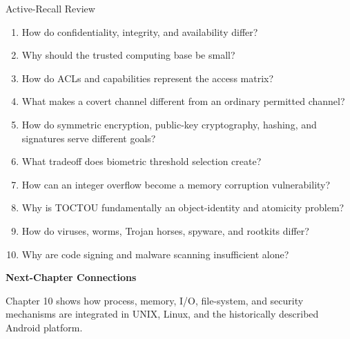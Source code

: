 \documentclass[10pt,letterpaper]{article}
\begin{document}
\enlargethispage{2\baselineskip}
\begin{studybox}{Active-Recall Review}
\small
\begin{enumerate}
  \item How do confidentiality, integrity, and availability differ?
  \item Why should the trusted computing base be small?
  \item How do ACLs and capabilities represent the access matrix?
  \item What makes a covert channel different from an ordinary permitted channel?
  \item How do symmetric encryption, public-key cryptography, hashing, and signatures serve different goals?
  \item What tradeoff does biometric threshold selection create?
  \item How can an integer overflow become a memory corruption vulnerability?
  \item Why is TOCTOU fundamentally an object-identity and atomicity problem?
  \item How do viruses, worms, Trojan horses, spyware, and rootkits differ?
  \item Why are code signing and malware scanning insufficient alone?
\end{enumerate}
\end{studybox}

\par\medskip
{\color{navy}\bfseries Next-Chapter Connections}\par\smallskip
Chapter 10 shows how process, memory, I/O, file-system, and security mechanisms are integrated in UNIX, Linux, and the historically described Android platform.
\normalsize
\end{document}
